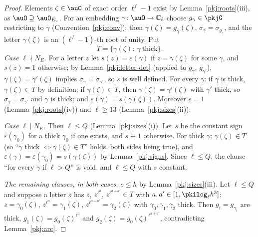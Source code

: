 \documentclass[10pt]{amsart}
\theoremstyle{definition}
\theoremstyle{remark}
\newcommand{\C}{\mathbb C}
\begin{document}
\begin{proof}
Elements $\zeta\in\auO$ of exact order $\ell^f-1$ exist by Lemma~\ref{pkj:roots}(iii), as
$\auO\supseteq\auO_{E_v}$. For an embedding $\gamma\colon\auO\to\C_\ell$ choose $g_\gamma\in\pkjG$
restricting to $\gamma$ (Convention~\ref{pkj:conv}); then $\gamma(\zeta)=g_\gamma(\zeta)$,
$\sigma_\gamma=\sigma_{g_\gamma}$, and the letter $\gamma(\zeta)$ is an $(\ell^f-1)$-th root of unity. Put
\[
T=\{\gamma(\zeta):\ \gamma\ \text{thick}\}.
\]
\emph{Case $\ell\nmid N_E$.} For a letter $z$ let $s(z)=\varepsilon(\gamma)$ if $z=\gamma(\zeta)$ for some
$\gamma$, and $s(z)=1$ otherwise; by Lemma~\ref{pkj:letter-det} (applied to $g_\gamma$, $g_{\gamma'}$),
$\gamma(\zeta)=\gamma'(\zeta)$ implies $\sigma_\gamma=\sigma_{\gamma'}$, so $s$ is well defined. For every
$\gamma$: if $\gamma$ is thick, $\gamma(\zeta)\in T$ by definition; if $\gamma(\zeta)\in T$, then
$\gamma(\zeta)=\gamma'(\zeta)$ with $\gamma'$ thick, so $\sigma_\gamma=\sigma_{\gamma'}$ and $\gamma$ is thick;
and $\varepsilon(\gamma)=s(\gamma(\zeta))$. Moreover $e=1$ (Lemma~\ref{pkj:roots}(iv)) and $\ell\ge13$
(Lemma~\ref{pkj:sizes}(ii)).

\emph{Case $\ell\mid N_E$.} Then $\ell\le Q$ (Lemma~\ref{pkj:sizes}(i)). Let $s$ be the constant sign
$\varepsilon(\gamma_0)$ for a thick $\gamma_0$ if one exists, and $s\equiv1$ otherwise. For thick
$\gamma$: $\gamma(\zeta)\in T$ (so ``$\gamma$ thick $\Leftrightarrow\gamma(\zeta)\in T$'' holds, both sides
being true), and $\varepsilon(\gamma)=\varepsilon(\gamma_0)=s(\gamma(\zeta))$ by Lemma~\ref{pkj:signs}. Since
$\ell\le Q$, the clause ``for every $\gamma$ if $\ell>Q$'' is void, and $\ell\le Q$ with $s$ constant.

\emph{The remaining clauses, in both cases.} $e\le h$ by Lemma~\ref{pkj:sizes}(iii). Let $\ell\le Q$ and
suppose a letter $z$ has $z$, $z^{\ell^a}$, $z^{\ell^{a+a'}}\in T$ with $a,a'\in[1,\pkilog_\ell h^3]$:
$z=\gamma_0(\zeta)$, $z^{\ell^a}=\gamma_1(\zeta)$, $z^{\ell^{a+a'}}=\gamma_2(\zeta)$ with $\gamma_0,\gamma_1,
\gamma_2$ thick. Then $g_i=g_{\gamma_i}$ are thick, $g_1(\zeta)=g_0(\zeta)^{\ell^a}$ and
$g_2(\zeta)=g_0(\zeta)^{\ell^{a+a'}}$, contradicting Lemma~\ref{pkj:arc}.
\end{proof}
\end{document}
